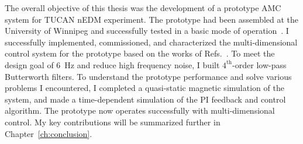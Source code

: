 The overall objective of this thesis was the development of a prototype AMC system for TUCAN nEDM experiment. The prototype had been assembled at the University of Winnipeg and successfully tested in a basic mode of operation~\cite{liam_presentation}. I successfully implemented, commissioned, and characterized the multi-dimensional control system for the prototype based on the works of Refs.~\cite{bea,lins}. To meet the design goal of 6~Hz and reduce high frequency noise, I built $\mathrm{4^{th}}$-order low-pass Butterworth filters. To understand the prototype performance and solve various problems I encountered, I completed a quasi-static magnetic simulation of the system, and made a time-dependent simulation of the PI feedback and control algorithm. The prototype now operates successfully with multi-dimensional control. My key contributions will be summarized further in Chapter~\ref{ch:conclusion}.










